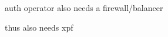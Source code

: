 \documentclass{beamer}
\begin{document}
\begin{frame}{auth operator also needs a firewall/balancer}
\end{frame}

\begin{frame}{thus also needs xpf}
\end{frame}
\end{document}
